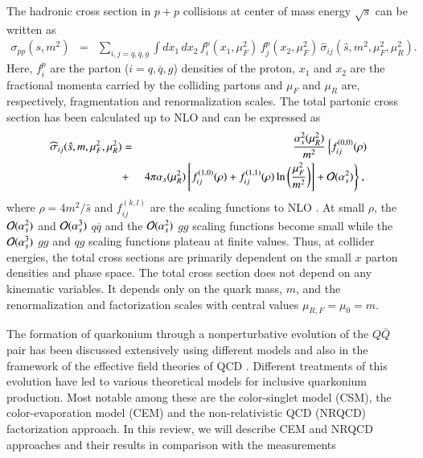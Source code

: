 The hadronic cross section in $p+p$ collisions at center of mass energy
$\sqrt{s}$ can be written as
\begin{eqnarray}
\sigma_{pp}(s,m^2) & = & \sum_{i,j = q, \overline q, g} 
\int dx_1 \, dx_2 \, 
f_i^p (x_1,\mu_F^2) \,
f_j^p(x_2,\mu_F^2) \, \widehat{\sigma}_{ij}(\hat{s},m^2,\mu_F^2,\mu_R^2).
\label{sigpp}
\end{eqnarray}
Here, $f_i^p$ are the parton (${i = q, \overline q, g}$) densities of the proton,
$x_1$ and $x_2$ are the fractional momenta carried by the colliding
partons and $\mu_F$ and $\mu_R$ are, respectively, fragmentation and renormalization scales. 
The total partonic cross section has been calculated up to NLO
\cite{Nason:1989zy,Nason:1987xz} and can be expressed as
\begin{eqnarray}
\widehat{\sigma}_{ij}(\hat{s},m,\mu_F^2,\mu_R^2) & = & 
\frac{\alpha_s^2(\mu_R^2)}{m^2}
\left\{ f^{(0,0)}_{ij}(\rho) \right. \nonumber \\
 & + & \left. 4\pi \alpha_s(\mu_R^2) \left[f^{(1,0)}_{ij}(\rho) + 
f^{(1,1)}_{ij}(\rho)\ln\bigg(\frac{\mu_F^2}{m^2} \bigg) \right] 
+ {\cal O}(\alpha_s^2) \right\},
\,\, 
\label{sigpart}
\end{eqnarray}
where $\rho = 4m^2/\hat{s}$ and 
$f_{ij}^{(k,l)}$ are the scaling functions to NLO \cite{Nason:1989zy,Nason:1987xz}. 
At small $\rho$, the ${\cal O}(\alpha_s^2)$ and ${\cal O}(\alpha_s^3)$
$q \overline q$ and the ${\cal O}(\alpha_s^2)$ $gg$ scaling functions 
become small while the ${\cal O}(\alpha_s^3)$ $gg$ and $qg$ scaling functions
plateau at finite values.  Thus, at collider energies, the total cross sections
are primarily dependent on the small $x$ parton densities and phase space.
The total cross section does not depend on any kinematic variables. It depends  
only on the quark mass, $m$, and the renormalization and factorization scales with central
values $\mu_{R,F} =\mu_0 = m$.


The formation of quarkonium through a nonperturbative evolution of the $Q\bar Q$ pair 
has been discussed extensively using different models and also in the framework of the 
  effective field theories of QCD
\cite{Bodwin:1994jh,Brambilla:2004wf}. Different
treatments of this evolution have led to various theoretical models for
inclusive quarkonium production. Most notable among these are the color-singlet
model (CSM), the color-evaporation model (CEM) and the non-relativistic QCD
(NRQCD) factorization approach. In this review, we will describe CEM and NRQCD 
approaches and their results in comparison with the measurements 



